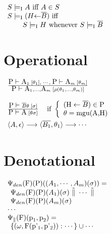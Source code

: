 \documentclass[portrait,final,a0paper]{nadiposter}
\begin{document}
\begin{poster}
{\( \begin{array}{l}
S \mbox{$\; \models_{\mbox{\scriptsize {I}}} \;$} A \mbox{ iff } A \in S \\
S \mbox{$\; \models_{\mbox{\scriptsize {I}}} \;$} (H \mbox{$\leftarrow$} \overline{B}) \mbox{ iff } \\
\hspace*{5ex} S \mbox{$\; \models_{\mbox{\scriptsize {I}}} \;$} H \mbox{ whenever } S \mbox{$\; \models_{\mbox{\scriptsize {I}}} \;$} \overline{B} \\
\end{array} \)

\section*{Operational}

\( \begin{array}{l}
%
\frac{ \mf{P} \tpd \mf{A}_{1} \; [\theta_{1}], \; \cdots, \;  
       \mf{P} \tpd \mf{A}_{m} \; [\theta_{m}]
    }{ \mf{P} \tpd \mf{A}_{1},\ldots,\mf{A}_{m}
            \; [\rho(\theta_{1},\ldots,\theta_{m})]
     }
\\ \\
\frac{ \mf{P} \tpd \mgoal{B}\theta \; [\sigma]
    }{ \mf{P} \tpd \mf{A} \;[\theta\sigma]
    }
\hspace*{2ex}\mbox{ if }
   \left\{ \begin{array}{l}
       (\mf{H}\leftarrow\mgoal{B}) \in \mf{P} \\
       \theta = \mf{mgu(A,H)}
       \end{array}\right.
\\*[1em]
\langle A,\epsilon \rangle \longrightarrow
   \langle \mgoal{B_1},\theta_1 \rangle \longrightarrow \cdots
\end{array} \)


\section*{Denotational}

\( \begin{array}{l}
     \mbox{$\Psi_{den}$} (\mbox{F}) (\mbox{P}) ( (A_{1},\cdots,A_{m})(\sigma) )
     = \\ \hspace*{1ex} 
     \mbox{$\Psi_{den}$} (\mbox{F}) (\mbox{P}) (A_{1})(\sigma)  
     \mbox{ $ \tilde{\parallel} $ }
     \cdots
     \mbox{ $ \tilde{\parallel} $ } \mbox{ } \\ \hspace*{1ex}
     \mbox{$\Psi_{den}$} (\mbox{F}) (\mbox{P}) (A_{m})(\sigma)
     \\ \cdots
     \\
     \mbox{$\Psi_{\parallel}$}(\mbox{F})(\mbox{p}_{1},\mbox{p}_{2}) = \\ \hspace*{1ex}
        \{ (\omega,\mbox{F}(\mbox{p'$_{1}$},\mbox{p'$_{2}$})) : \cdots \} \cup \cdots \mbox{ }
\end{array} \)


}
\end{poster}
\end{document}
